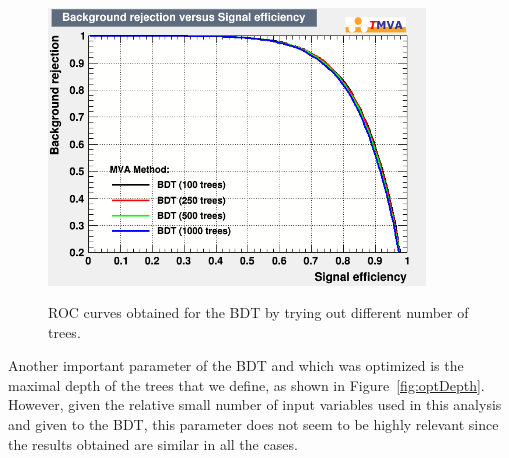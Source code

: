 \documentclass[a4paper, 10pt, openright]{report}
\begin{document}
\begin{appendices}

\begin{figure}[htbp]
\centering
\includegraphics[width=10cm, height=8cm]{figs/BDT_trees.png}
\caption{\ac{ROC} curves obtained for the \ac{BDT} by trying out different number of trees.}
\label{fig:optTrees}
\end{figure}

Another important parameter of the \ac{BDT} and which was optimized is the maximal depth of the trees that we define, as shown in Figure~\ref{fig:optDepth}. However, given the relative small number of input variables used in this analysis and given to the \ac{BDT}, this parameter does not seem to be highly relevant since the results obtained are similar in all the cases.


\end{appendices}
\end{document}

